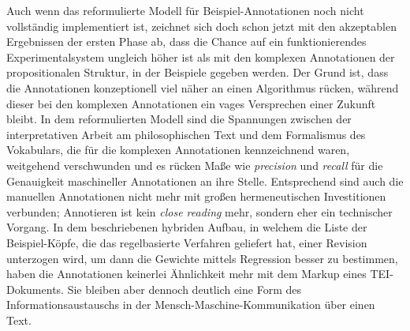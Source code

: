 \documentclass{article}
\newcommand*{\englisch}[1]{\foreignlanguage{english}{\textit{#1}}}%
\begin{document}
Auch wenn das reformulierte Modell für Beispiel-Annotationen noch
nicht vollständig implementiert ist, zeichnet sich doch schon jetzt
mit den akzeptablen Ergebnissen der ersten Phase ab, dass die Chance
auf ein funktionierendes Experimentalsystem ungleich höher ist als mit
den komplexen Annotationen der propositionalen Struktur, in der
Beispiele gegeben werden. Der Grund ist, dass die Annotationen
konzeptionell viel näher an einen Algorithmus rücken, während dieser
bei den komplexen Annotationen ein vages Versprechen einer Zukunft
bleibt. In dem reformulierten Modell sind die Spannungen zwischen der
interpretativen Arbeit am philosophischen Text und dem Formalismus des
Vokabulars, die für die komplexen Annotationen kennzeichnend waren,
weitgehend verschwunden und es rücken Maße wie \englisch{precision}
und \englisch{recall} für die Genauigkeit maschineller Annotationen an
ihre Stelle. Entsprechend sind auch die manuellen Annotationen nicht
mehr mit großen hermeneutischen Investitionen verbunden; Annotieren
ist kein \englisch{close reading} mehr, sondern eher ein technischer
Vorgang. In dem beschriebenen hybriden Aufbau, in welchem die Liste
der Beispiel-Köpfe, die das regelbasierte Verfahren geliefert hat,
einer Revision unterzogen wird, um dann die Gewichte mittels
Regression besser zu bestimmen, haben die Annotationen keinerlei
Ähnlichkeit mehr mit dem Markup eines TEI-Dokuments. Sie bleiben aber
dennoch deutlich eine Form des Informationsaustauschs in der
Mensch-Maschine-Kommunikation über einen Text.


\printbibliography



\end{document}
